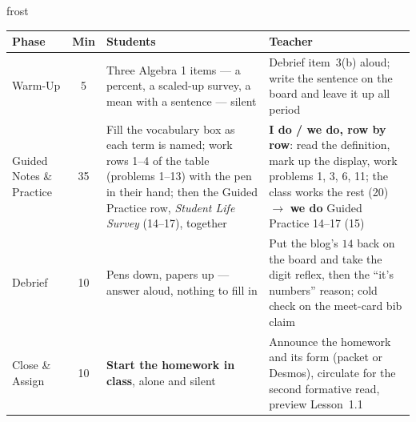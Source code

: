 \documentclass[10pt]{article}
\begin{document}
\begin{fixedskillbox}{frost}
\renewcommand{\arraystretch}{1.25}
\begin{tabularx}{\linewidth}{@{}l c X X@{}}
\textbf{Phase} & \textbf{Min} & \textbf{Students} & \textbf{Teacher} \\
\hline
Warm-Up & 5 & Three Algebra 1 items --- a percent, a scaled-up survey, a mean with a
  sentence --- silent & Debrief item~3(b) aloud; write the sentence on the board and leave
  it up all period \\
Guided Notes \& Practice & 35 & Fill the vocabulary box as each term is named; work rows
  1--4 of the table (problems 1--13) with the pen in their hand; then the Guided Practice row,
  \emph{Student Life Survey} (14--17), together & \textbf{I do / we do, row by row}: read the
  definition, mark up the display, work problems 1, 3, 6, 11; the class works the rest (20)
  $\to$ \textbf{we do} Guided Practice 14--17 (15) \\
Debrief & 10 & Pens down, papers up --- answer aloud, nothing to fill in & Put the blog's
  $14$ back on the board and take the digit reflex, then the ``it's numbers'' reason; cold
  check on the meet-card bib claim \\
Close \& Assign & 10 & \textbf{Start the homework in class}, alone and silent & Announce the
  homework and its form (packet or Desmos), circulate for the second formative read, preview
  Lesson~1.1 \\
\end{tabularx}
\end{fixedskillbox}
\end{document}
